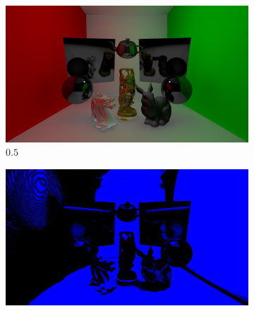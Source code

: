 \begin{figure}[H]
\begin{subfigure}[b]{.49\linewidth}
	\end{subfigure}%
	\par\smallskip
	\begin{subfigure}[b]{.49\linewidth}
		\centering
		\captionsetup{justification=centering}
		\caption*{$0.5$}
		\includegraphics[width=\linewidth]{media/finals/test_s050.png}
	\end{subfigure}%
	\hspace{0.01\textwidth}
	\begin{subfigure}[b]{.49\linewidth}
		\centering
		\captionsetup{justification=centering}
		\caption*{}
		\includegraphics[width=\linewidth]{media/finals/test_s050_diff.png}
	\end{subfigure}%
\end{figure}
